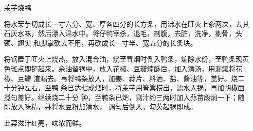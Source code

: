 \begin{recipe}{茉芋烧鸭}

\ingredients


\preparation

\step 将水茉芋切成长一寸六分、宽、厚各四分的长方条，用沸水在旺火上汆两次，去其
石灰水味，然后漂入温水中。将仔鸭宰杀，退毛，剖腹，去脏，洗净，剔骨，头颈、翅尖
和脚掌砍去不用，再砍成长一寸半、宽五分的长条块。

\step 将锅置于旺火上烧热，放入混合油，烧至冒烟时倒入鸭条，煸除水份，至鸭条现黄
色斑点即铲起来。余油留锅中，放入花椒、豆瓣煵酥后，加入清汤，用漏瓢将花椒、豆瓣
渣漏去。再将鸭条放入，加姜、蒜片、料酒、盐、酱油等，盖好。烧二十分钟左右，至鸭
条已达七成𤆵时，将茉芋用筲箕捞出，滤水入锅，再加胡椒面搅匀盖好。继续烧二十分
钟，至鸭条已𤆵，剩汁约三两时加入蒜苗段焖一下；随即放入味精，并将水豆粉加清水，
调匀后倒入，勾芡起锅即成。

\features

此菜滋汁红亮，味浓而鲜。

\end{recipe}

